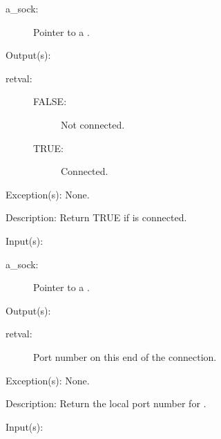 \begin{capi}
\begin{capilist}
		\begin{description}\item[]
		\item[a\_sock: ]
			Pointer to a .
		\end{description}
	\item[Output(s): ]
		\begin{description}\item[]
		\item[retval: ]
			\begin{description}\item[]
			\item[FALSE: ]
				Not connected.
			\item[TRUE: ]
				Connected.
			\end{description}
		\end{description}
	\item[Exception(s): ] None.
	\item[Description: ]
		Return TRUE if  is connected.
	\end{capilist}
\label{sock_port_get}
	\begin{capilist}
	\item[Input(s): ]
		\begin{description}\item[]
		\item[a\_sock: ]
			Pointer to a .
		\end{description}
	\item[Output(s): ]
		\begin{description}\item[]
		\item[retval: ]
			Port number on this end of the connection.
		\end{description}
	\item[Exception(s): ] None.
	\item[Description: ]
		Return the local port number for .
	\end{capilist}
\label{sock_connect}
	\begin{capilist}
	\item[Input(s): ]
		\begin{description}\item[]

\end{description}
\end{capilist}
\end{capi}
